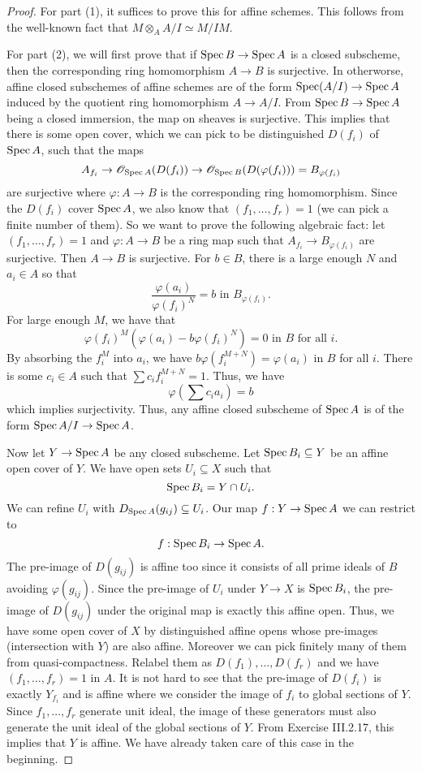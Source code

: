 \documentclass[]{pcmi}
\theoremstyle{plain}
\theoremstyle{definition}
\theoremstyle{remark}
\begin{document}
\begin{proof}
    For part (1), it suffices to prove this for affine schemes. This follows from the well-known fact that $M \otimes_A A/I \simeq M / IM$. 

    For part (2), we will first prove that if $\operatorname{Spec} B \to \operatorname{Spec} A$ is a closed subscheme, then the corresponding ring homomorphism $A \to B$ is surjective. In otherworse, affine closed subschemes of affine schemes are of the form $\operatorname{Spec} (A/I) \to \operatorname{Spec} A$ induced by the quotient ring homomorphism $A \to A/I$. From $\operatorname{Spec} B \to \operatorname{Spec} A$ being a closed immersion, the map on sheaves is surjective. This implies that there is some open cover, which we can pick to be distinguished $D(f_i)$ of $\operatorname{Spec} A$, such that the maps
    \[
        A_{f_i} \to \mathscr{O}_{\operatorname{Spec} A} (D(f_i)) \to \mathscr{O}_{\operatorname{Spec} B}(D(\varphi(f_i))) = B_{\varphi(f_i)}
    \]
    are surjective where $\varphi : A \to B$ is the corresponding ring homomorphism. Since the $D(f_i)$ cover $\operatorname{Spec} A$, we also know that $(f_1, \ldots, f_r) = 1$ (we can pick a finite number of them). So we want to prove the following algebraic fact: let $(f_1, \ldots, f_r) = 1$ and $\varphi : A \to B$ be a ring map such that $A_{f_i} \to B_{\varphi(f_i)}$ are surjective. Then $A \to B$ is surjective. For $b \in B$, there is a large enough $N$ and $a_i \in A$ so that 
    \[
        \frac{\varphi(a_i)}{\varphi(f_i)^N} = b \text{ in } B_{\varphi(f_i)}. 
    \]
    For large enough $M$, we have that 
    \[
        \varphi(f_i)^M \left (\varphi(a_i) - b \varphi(f_i)^N \right ) = 0 \text{ in } B \text{ for all $i$}.
    \]
    By absorbing the $f_i^M$ into $a_i$, we have $b \varphi(f_i^{M+N}) = \varphi(a_i)$ in $B$ for all $i$. There is some $c_i \in A$ such that $\sum c_i f_i^{M+N} = 1$. Thus, we have 
    \[
        \varphi \left( \sum c_i a_i \right) = b
    \]
    which implies surjectivity. Thus, any affine closed subscheme of $\operatorname{Spec} A$ is of the form $\operatorname{Spec} A/I \to \operatorname{Spec} A$. 

    Now let $Y \to \operatorname{Spec} A$ be any closed subscheme. Let $\operatorname{Spec} B_i \subseteq Y$ be an affine open cover of $Y$. We have open sets $U_i \subseteq X$ such that 
    \[
        \operatorname{Spec} B_i = Y \cap U_i. 
    \]
    We can refine $U_i$ with $D_{\operatorname{Spec} A}(g_{ij}) \subseteq U_i$. Our map $f : Y \to \operatorname{Spec} A$ we can restrict to 
    \[
        f : \operatorname{Spec} B_i \to \operatorname{Spec} A.
    \]
    The pre-image of $D(g_{ij})$ is affine too since it consists of all prime ideals of $B$ avoiding $\varphi(g_{ij})$. Since the pre-image of $U_i$ under $Y \to X$ is $\operatorname{Spec} B_i$, the pre-image of $D(g_{ij})$ under the original map is exactly this affine open. Thus, we have some open cover of $X$ by distinguished affine opens whose pre-images (intersection with $Y$) are also affine. Moreover we can pick finitely many of them from quasi-compactness. Relabel them as $D(f_1), \ldots, D(f_r)$ and we have $(f_1, \ldots, f_r) = 1$ in $A$. It is not hard to see that the pre-image of $D(f_i)$ is exactly $Y_{f_i}$ and is affine where we consider the image of $f_i$ to global sections of $Y$. Since $f_1, \ldots, f_r$ generate unit ideal, the image of these generators must also generate the unit ideal of the global sections of $Y$. From Exercise III.2.17, this implies that $Y$ is affine. We have already taken care of this case in the beginning. 


\end{proof}
\end{document}
